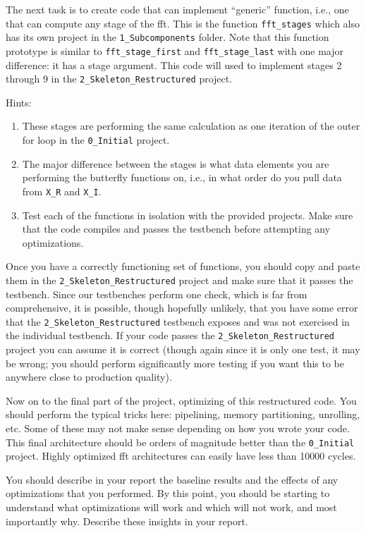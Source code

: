 The next task is to create code that can implement ``generic'' function, i.e., one that can compute any stage of the \gls{fft}. This is the function \texttt{fft\_stages} which also has its own project in the \texttt{1\_Subcomponents} folder. Note that this function prototype is similar to \texttt{fft\_stage\_first} and \texttt{fft\_stage\_last} with one major difference: it has a stage argument. This code will used to implement stages 2 through 9 in the \texttt{2\_Skeleton\_Restructured} project.

Hints:
\begin{enumerate}
\item These stages are performing the same calculation as one iteration of the outer for loop in the \texttt{0\_Initial} project.
\item The major difference between the stages is what data elements you are performing the butterfly functions on, i.e., in what order do you pull data from \texttt{X\_R} and \texttt{X\_I}.
\item Test each of the functions in isolation with the provided projects. Make sure that the code compiles and passes the testbench before attempting any optimizations.
\end{enumerate}

Once you have a correctly functioning set of functions, you should copy and paste them in the \texttt{2\_Skeleton\_Restructured} project and make sure that it passes the testbench. Since our testbenches perform one check, which is far from comprehensive, it is possible, though hopefully unlikely, that you have some error that the \texttt{2\_Skeleton\_Restructured} testbench exposes and was not exercised in the individual testbench. If your code passes the \texttt{2\_Skeleton\_Restructured} project you can assume it is correct (though again since it is only one test, it may be wrong; you should perform significantly more testing if you want this to be anywhere close to production quality).

Now on to the final part of the project, optimizing of this restructured code. You should perform the typical tricks here: pipelining, memory partitioning, unrolling, etc. Some of these may not make sense depending on how you wrote your code. This final architecture should be orders of magnitude better than the \texttt{0\_Initial} project. Highly optimized \gls{fft} architectures can easily have less than 10000 cycles.

You should describe in your report the baseline results and the effects of any optimizations that you performed. By this point, you should be starting to understand what optimizations will work and which will not work, and most importantly why. Describe these insights in your report.

